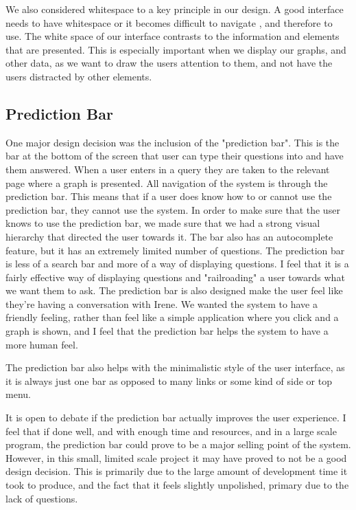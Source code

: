 \documentclass[10pt, journal]{IEEEtran}
\begin{document}
We also considered whitespace to a key principle in our design. A good interface needs to have whitespace or it becomes difficult to navigate \cite{whitespace}, and therefore to use. The white space of our interface contrasts to the information and elements that are presented. This is especially important when we display our graphs, and other data, as we want to draw the users attention to them, and not have the users distracted by other elements.


\subsection{Prediction Bar}

One major design decision was the inclusion of the "prediction bar". This is the bar at the bottom of the screen that user can type their questions into and have them answered. When a user enters in a query they are taken to the relevant page where a graph is presented. All navigation of the system is through the prediction bar. This means that if a user does know how to or cannot use the prediction bar, they cannot use the system. In order to make sure that the user knows to use the prediction bar, we made sure that we had a strong visual hierarchy that directed the user towards it. The bar also has an autocomplete feature, but it has an extremely limited number of questions. The prediction bar is less of a search bar and more of a way of displaying questions. I feel that it is a fairly effective way of displaying questions and "railroading" a user towards what we want them to ask. The prediction bar is also designed make the user feel like they're having a conversation with Irene. We wanted the system to have a friendly feeling, rather than feel like a simple application where you click and a graph is shown, and I feel that the prediction bar helps the system to have a more human feel. 

The prediction bar also helps with the minimalistic style of the user interface, as it is always just one bar as opposed to many links or some kind of side or top menu.

It is open to debate if the prediction bar actually improves the user experience. I feel that if done well, and with enough time and resources, and in a large scale program, the prediction bar could prove to be a major selling point of the system. However, in this small, limited scale project it may have proved to not be a good design decision. This is primarily due to the large amount of development time it took to produce, and the fact that it feels slightly unpolished, primary due to the lack of questions. 
\end{document}
